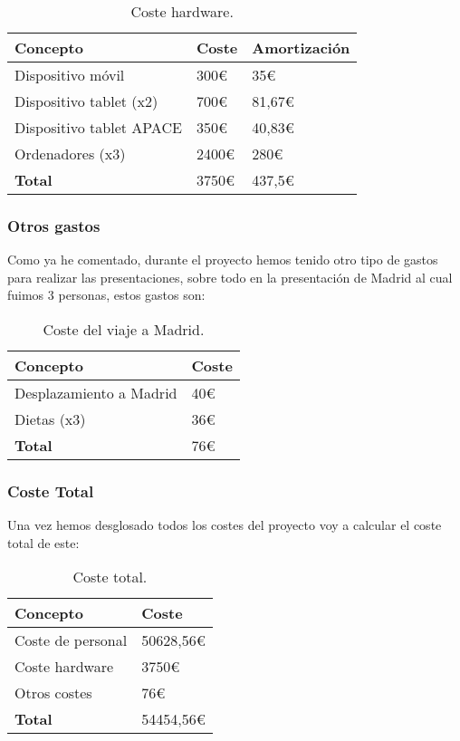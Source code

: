 \begin{table}[H]
	\centering
	\begin{tabular}{lll}
		\toprule
		\textbf{Concepto}        & \textbf{Coste} & \textbf{Amortización} \\ \midrule
		Dispositivo móvil        & 300\euro        & 35\euro                \\
		Dispositivo tablet (x2)  & 700\euro        & 81,67\euro             \\
		Dispositivo tablet APACE & 350\euro        & 40,83\euro             \\
		Ordenadores (x3)         & 2400\euro       & 280\euro               \\ \midrule
		\textbf{Total}           & 3750\euro       & 437,5\euro             \\ \bottomrule
	\end{tabular}
	\caption{Coste hardware.}
\end{table}

\subsubsection{Otros gastos}
Como ya he comentado, durante el proyecto hemos tenido otro tipo de gastos para realizar las presentaciones, sobre todo en la presentación de Madrid al cual fuimos 3 personas, estos gastos son:

\begin{table}[H]
	\centering
	\begin{tabular}{ll}
		\toprule
		\textbf{Concepto}       & \textbf{Coste} \\ \midrule
		Desplazamiento a Madrid & 40\euro         \\
		Dietas (x3)             & 36\euro         \\ \midrule
		\textbf{Total}          & 76\euro         \\ \bottomrule
	\end{tabular}
	\caption{Coste del viaje a Madrid.}
\end{table}

\subsubsection{Coste Total}
Una vez hemos desglosado todos los costes del proyecto voy a calcular el coste total de este:

\begin{table}[H]
	\centering
	\begin{tabular}{ll}
		\toprule
		\textbf{Concepto} & \textbf{Coste} \\ \midrule
		Coste de personal & 50628,56\euro   \\
		Coste hardware    & 3750\euro       \\
		Otros costes      & 76\euro         \\ \midrule
		\textbf{Total}    & 54454,56\euro   \\ \bottomrule
	\end{tabular}
	\caption{Coste total.}
\end{table}

